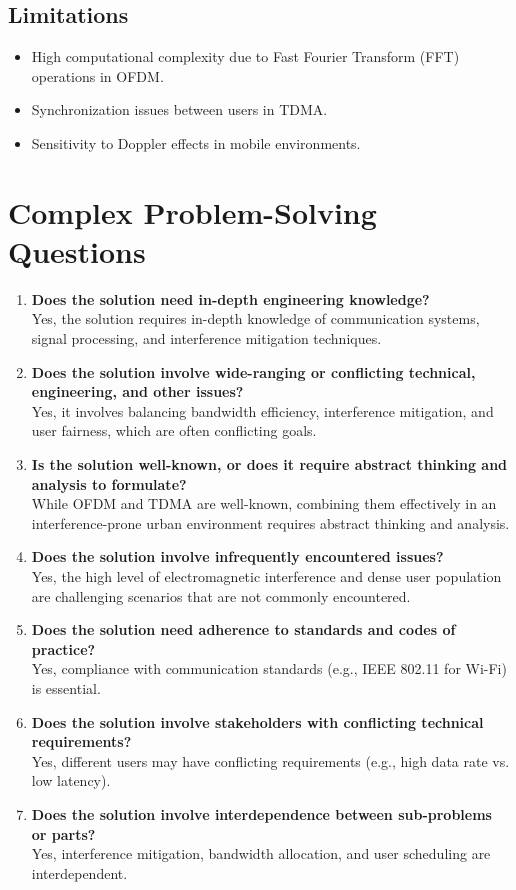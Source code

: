 \documentclass[12pt]{article}
\begin{document}
\subsection*{Limitations}
\begin{itemize}
    \item High computational complexity due to Fast Fourier Transform (FFT) operations in OFDM.
    \item Synchronization issues between users in TDMA.
    \item Sensitivity to Doppler effects in mobile environments.
\end{itemize}

\section*{Complex Problem-Solving Questions}
\begin{enumerate}
    \item \textbf{Does the solution need in-depth engineering knowledge?} \\
    Yes, the solution requires in-depth knowledge of communication systems, signal processing, and interference mitigation techniques.
    
    \item \textbf{Does the solution involve wide-ranging or conflicting technical, engineering, and other issues?} \\
    Yes, it involves balancing bandwidth efficiency, interference mitigation, and user fairness, which are often conflicting goals.
    
    \item \textbf{Is the solution well-known, or does it require abstract thinking and analysis to formulate?} \\
    While OFDM and TDMA are well-known, combining them effectively in an interference-prone urban environment requires abstract thinking and analysis.
    
    \item \textbf{Does the solution involve infrequently encountered issues?} \\
    Yes, the high level of electromagnetic interference and dense user population are challenging scenarios that are not commonly encountered.
    
    \item \textbf{Does the solution need adherence to standards and codes of practice?} \\
    Yes, compliance with communication standards (e.g., IEEE 802.11 for Wi-Fi) is essential.
    
    \item \textbf{Does the solution involve stakeholders with conflicting technical requirements?} \\
    Yes, different users may have conflicting requirements (e.g., high data rate vs. low latency).
    
    \item \textbf{Does the solution involve interdependence between sub-problems or parts?} \\
    Yes, interference mitigation, bandwidth allocation, and user scheduling are interdependent.
\end{enumerate}
\end{document}

